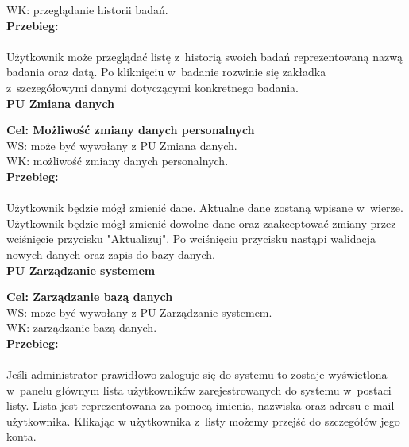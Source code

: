\documentclass[12pt, letterpaper]{article}
\begin{document}
		WK: przeglądanie historii badań.\\
		
		\textbf{Przebieg:}
\paragraph{}Użytkownik może przeglądać listę z~historią swoich badań reprezentowaną nazwą badania oraz datą. Po kliknięciu w~badanie rozwinie się zakładka z~szczegółowymi danymi dotyczącymi konkretnego badania.\\
		 
		
		\textbf{PU Zmiana danych}
		
		\quad
		
		\textbf{Cel: Możliwość zmiany danych personalnych}\\
		
		WS: może być wywołany z PU Zmiana danych.\\
		
		WK: możliwość zmiany danych personalnych.\\
		
		\textbf{Przebieg:}
\paragraph{}Użytkownik będzie mógł zmienić dane. Aktualne dane zostaną wpisane w~wierze. Użytkownik będzie mógł zmienić dowolne dane oraz zaakceptować zmiany przez wciśnięcie przycisku "Aktualizuj". Po wciśnięciu przycisku nastąpi walidacja nowych danych oraz zapis do bazy danych.\\
		
		
		\textbf{PU Zarządzanie systemem}
		
		\quad
		
		\textbf{Cel: Zarządzanie bazą danych}\\
		
		WS: może być wywołany z PU Zarządzanie systemem.\\
		
		WK: zarządzanie bazą danych. \\
		
		\textbf{Przebieg:}
\paragraph{}Jeśli administrator prawidłowo zaloguje się do systemu to zostaje wyświetlona w~panelu głównym lista użytkowników zarejestrowanych do systemu w~postaci listy. Lista jest reprezentowana za pomocą imienia, nazwiska oraz adresu e-mail użytkownika. Klikając w użytkownika z~listy możemy przejść do szczegółów jego konta.\\	
		
\end{document}
